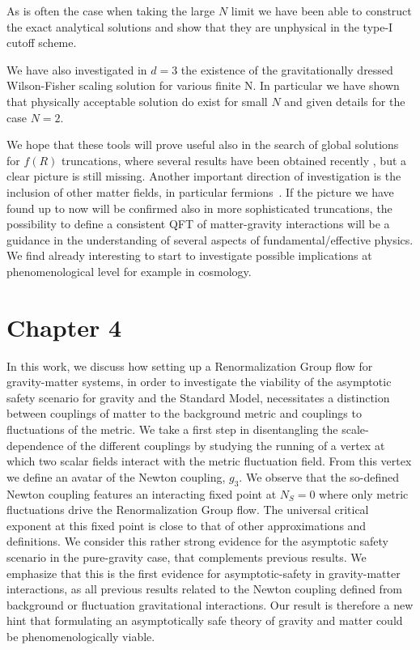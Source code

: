 \documentclass[11pt]{book} %
\numberwithin{equation}{chapter}
\begin{document}
As is often the case when taking the large $N$ limit we have been
able to construct the exact analytical solutions
and show that they are unphysical in the type-I cutoff scheme.

We have also investigated in $d=3$ the existence of the gravitationally
dressed Wilson-Fisher scaling solution for various finite N.
In particular we have shown that physically acceptable solution do exist
for small $N$ and given details for the case $N=2$.

We hope that these tools will prove useful also in the search
of global solutions for $f(R)$ truncations,
where several results have been obtained recently
\cite{Benedetti:2012dx,Benedetti:2013jk,Demmel:2012ub,Dietz:2012ic,Dietz:2013sba,Demmel:2015oqa},
but a clear picture is still missing.
Another important direction of investigation is the inclusion of other matter fields,
in particular fermions~\cite{Zanusso:2009bs,Vacca:2010mj,Eichhorn:2011pc,Vacca:2015nta}.
If the picture we have found up to now will be confirmed also in more sophisticated truncations,
the possibility to define a consistent QFT of matter-gravity interactions
will be a guidance in the understanding of several aspects of fundamental/effective physics.
We find already interesting to start to investigate possible implications at
phenomenological level for example in cosmology.


\section*{Chapter 4}

In this work, we discuss how setting up a Renormalization Group flow for gravity-matter systems,
in order to investigate the viability of the asymptotic safety scenario for gravity and the Standard Model,
necessitates a distinction between couplings of matter to the background metric and couplings to
fluctuations of the metric.
We take a first step in disentangling the scale-dependence of the different couplings by studying
the running of a vertex at which two scalar fields interact with the metric fluctuation field.
From this vertex we define an avatar of the Newton coupling, $g_3$.
We observe that the so-defined Newton coupling features an interacting fixed point at $N_S=0$
where only metric fluctuations drive the Renormalization Group flow.
The universal critical exponent at this fixed point is close to that of other approximations and definitions.
We consider this rather strong evidence for the asymptotic safety scenario  in the pure-gravity case,
that complements previous results.
We emphasize that this is the first evidence for asymptotic-safety in gravity-matter interactions,
as all previous results related to the Newton coupling defined from background or fluctuation
gravitational interactions.
Our result is therefore a new hint that formulating an asymptotically safe theory of gravity
and matter could be phenomenologically viable.\newline
\end{document}
